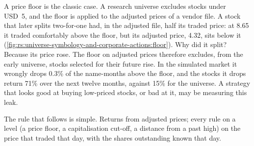A price floor is the classic case. A research universe excludes stocks under USD~5, and the floor is applied to the adjusted
prices of a vendor file. A stock that later splits two-for-one had, in the adjusted file, half its traded price: at 8.65 it traded
comfortably above the floor, but its adjusted price, 4.32, sits below it
(\cref{fig:rs:universe-symbology-and-corporate-actions:floor}). Why did it split? Because its price rose. The floor on adjusted
prices therefore excludes, from the early universe, stocks selected for their future rise. In the simulated market it wrongly
drops 0.3\% of the name-months above the floor, and the stocks it drops return 71\% over the next twelve months, against 15\%
for the universe. A strategy that looks good at buying low-priced stocks, or bad at it, may be measuring this leak.

\begin{omfigure}

\label{fig:rs:universe-symbology-and-corporate-actions:floor}
\end{omfigure}

The rule that follows is simple. Returns from adjusted prices; every rule on a level (a price floor, a capitalisation cut-off, a
distance from a past high) on the price that traded that day, with the shares outstanding known that day.

